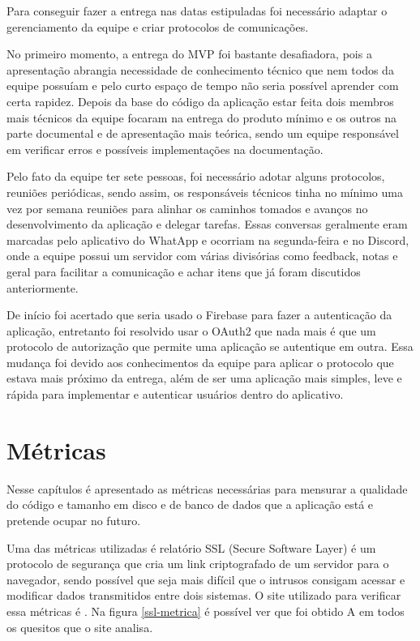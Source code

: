 Para conseguir fazer a entrega nas datas estipuladas foi necessário adaptar o gerenciamento da equipe e criar protocolos de comunicações. 

No primeiro momento, a entrega do MVP foi bastante desafiadora, pois a apresentação abrangia necessidade de conhecimento técnico que nem todos da equipe possuíam e pelo curto espaço de tempo não seria possível aprender com certa rapidez. Depois da base do código da aplicação estar feita dois membros mais técnicos da equipe focaram na entrega do produto mínimo e os outros na parte documental e de apresentação mais teórica, sendo um equipe responsável em verificar erros e possíveis implementações na documentação.

Pelo fato da equipe ter sete pessoas, foi necessário adotar alguns protocolos, reuniões periódicas, sendo assim, os responsáveis técnicos tinha no mínimo uma vez por semana reuniões para alinhar os caminhos tomados e avanços no desenvolvimento da aplicação e delegar tarefas. Essas conversas geralmente eram marcadas pelo aplicativo do WhatApp e ocorriam na segunda-feira e no Discord, onde a equipe possui um servidor com várias divisórias como feedback, notas e geral para facilitar a comunicação e achar itens que já foram discutidos anteriormente.  

De início foi acertado que seria usado o Firebase para fazer a autenticação da aplicação, entretanto foi resolvido usar o OAuth2 que nada mais é que um protocolo de autorização que permite uma aplicação se autentique em outra. Essa mudança foi devido aos conhecimentos da equipe para aplicar o protocolo que estava mais próximo da entrega, além de ser uma aplicação mais simples, leve e rápida para implementar e autenticar usuários dentro do aplicativo. 
 
\section{Métricas}
Nesse capítulos é apresentado as métricas necessárias para mensurar a qualidade do código e tamanho em disco e de banco de dados que a aplicação está e pretende ocupar no futuro. 

Uma das métricas utilizadas é relatório SSL (Secure Software Layer) é um protocolo de segurança que cria um link criptografado de um servidor para o navegador, sendo possível que seja mais difícil que o intrusos consigam acessar e modificar dados transmitidos entre dois sistemas. O site utilizado para verificar essa métricas é . Na figura \autoref{ssl-metrica} é possível ver que foi obtido A em todos os quesitos que o site analisa. 


